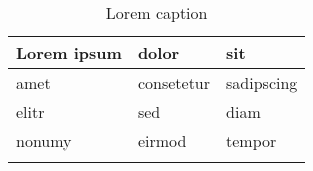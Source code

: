 ﻿\begin{longtable}[l]{|l|l|l|}
\hline
      Lorem ipsum 
    & dolor 
    & sit \\ \hline
      amet 
    & consetetur 
    & sadipscing \\ \hline
      elitr 
    & sed 
    & diam \\ \hline
      nonumy 
    & eirmod 
    & tempor \\ \hline
\caption{Lorem caption}
\label{tab:validtablemarkdown}
\end{longtable}